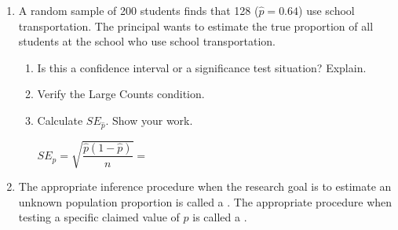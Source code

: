 \documentclass[10pt]{article}
\begin{document}
\namedateperiod

\vspace{0.15in}

\begin{enumerate}
  \item A random sample of 200 students finds that 128 ($\hat p = 0.64$) use school
        transportation. The principal wants to estimate the true proportion of all
        students at the school who use school transportation.

        \begin{enumerate}[label=\alph*.]
          \item Is this a confidence interval or a significance test situation? Explain.

          \item Verify the Large Counts condition.

          \item Calculate $SE_{\hat p}$. Show your work.

                $SE_{\hat p} = \sqrt{\dfrac{\hat p(1-\hat p)}{n}} = $ 
        \end{enumerate}

  \item The appropriate inference procedure when the research goal is to estimate an
        unknown population proportion is called a .
        The appropriate procedure when testing a specific claimed value of $p$ is
        called a .
\end{enumerate}
\end{document}
